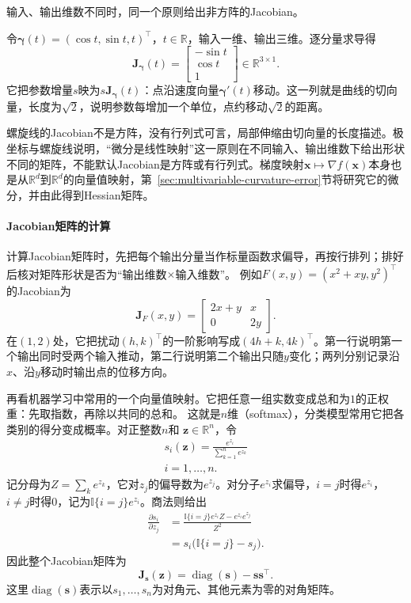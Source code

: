 输入、输出维数不同时，同一个原则给出非方阵的Jacobian。
\begin{example}[空间螺旋线的Jacobian矩阵]
\label{ex:multivariable-helix-jacobian}
令$\bm\gamma(t)=(\cos t,\sin t,t)^\top$，$t\in\mathbb R$，输入一维、输出三维。逐分量求导得
\[
 \bm J_{\bm\gamma}(t)=\begin{bmatrix}-\sin t\\ \cos t\\ 1\end{bmatrix}\in\mathbb R^{3\times1}.
\]
它把参数增量$s$映为$s\bm J_{\bm\gamma}(t)$：点沿速度向量$\bm\gamma'(t)$移动。这一列就是曲线的切向量，长度为$\sqrt2$，说明参数每增加一个单位，点约移动$\sqrt2$的距离。
\end{example}
螺旋线的Jacobian不是方阵，没有行列式可言，局部伸缩由切向量的长度描述。极坐标与螺旋线说明，“微分是线性映射”这一原则在不同输入、输出维数下给出形状不同的矩阵，不能默认Jacobian是方阵或有行列式。梯度映射$\bm x\mapsto\nabla f(\bm x)$本身也是从$\mathbb R^d$到$\mathbb R^d$的向量值映射，第~\ref{sec:multivariable-curvature-error}节将研究它的微分，并由此得到Hessian矩阵。

\paragraph{Jacobian矩阵的计算}
计算Jacobian矩阵时，先把每个输出分量当作标量函数求偏导，再按行排列；排好后核对矩阵形状是否为“输出维数$\times$输入维数”。
例如$F(x,y)=(x^2+xy,y^2)^\top$的Jacobian为
\[
 \bm J_F(x,y)=\begin{bmatrix}2x+y&x\\0&2y\end{bmatrix}.
\]
在$(1,2)$处，它把扰动$(h,k)^\top$的一阶影响写成$(4h+k,4k)^\top$。第一行说明第一个输出同时受两个输入推动，第二行说明第二个输出只随$y$变化；两列分别记录沿$x$、沿$y$移动时输出点的位移方向。

再看机器学习中常用的一个向量值映射。它把任意一组实数变成总和为$1$的正权重：先取指数，再除以共同的总和。
这就是$n$维（softmax），分类模型常用它把各类别的得分变成概率。对正整数$n$和
$\bm{z}\in\mathbb{R}^n$，令
\[
 \begin{gathered}
s_i(\bm{z})
  =
  \frac{e^{z_i}}{\sum_{k=1}^n e^{z_k}}\\
i=1,\ldots,n.
 \end{gathered}
\]
记分母为$Z=\sum_k e^{z_k}$，它对$z_j$的偏导数为$e^{z_j}$。对分子$e^{z_i}$求偏导，$i=j$时得$e^{z_i}$，$i\neq j$时得$0$，记为$\mathbb{I}\{i=j\}e^{z_i}$。商法则给出
\[
 \begin{aligned}
  \frac{\partial s_i}{\partial z_j}
  &=\frac{\mathbb{I}\{i=j\}e^{z_i}Z-e^{z_i}e^{z_j}}{Z^2}\\
  &=s_i\bigl(\mathbb{I}\{i=j\}-s_j\bigr).
 \end{aligned}
\]
因此整个Jacobian矩阵为
\begin{equation}
  \bm{J}_{\bm{s}}(\bm{z})
  =
  \operatorname{diag}(\bm{s})-\bm{s}\bm{s}^{\top}.
\label{eq:analysis-softmax-jacobian}
\end{equation}
这里$\operatorname{diag}(\bm s)$表示以$s_1,\ldots,s_n$为对角元、其他元素为零的对角矩阵。

